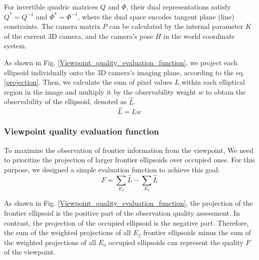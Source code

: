 For invertible quadric matrices $Q$ and $\Phi$, their dual representations satisfy $Q^{*} = Q^{-1}$ and $\Phi^{*} = \Phi^{-1}$, where the dual space encodes tangent plane (line) constraints. 
The camera matrix $P$ can be calculated by the internal parameter $K$ of the current 3D camera, and the camera's pose $H$ in the world coordinate system\cite{hartley2003multiple}.

As shown in Fig. \ref{Viewpoint_quality_evaluation_function}, we project each ellipsoid individually onto the 3D camera's imaging plane, according to the eq. \ref{projection}.
Then, we calculate the sum of pixel values $L$ within each elliptical region in the image and multiply it by the observability weight $w$ to obtain the observability of the ellipsoid, denoted as $\hat{L}$.
\begin{equation}
    \hat{L} = Lw 
\end{equation}

\subsubsection{Viewpoint quality evaluation function}
To maximize the observation of frontier information from the viewpoint,
We need to prioritize the projection of larger frontier ellipsoids over occupied ones. 
For this purpose, we designed a simple evaluation function to achieve this goal:
\begin{equation}
    F = \sum_{E_f} \hat{L} - \sum_{E_o}\hat{L}
\end{equation}

As shown in Fig. \ref{Viewpoint_quality_evaluation_function}, the projection of the frontier ellipsoid is the positive part of the observation quality assessment. In contrast, the projection of the occupied ellipsoid is the negative part.
Therefore, the sum of the weighted projections of all $E_f$ frontier ellipsoids minus the sum of the weighted projections of all $E_o$ occupied ellipsoids can represent the quality $F$ of the viewpoint.

